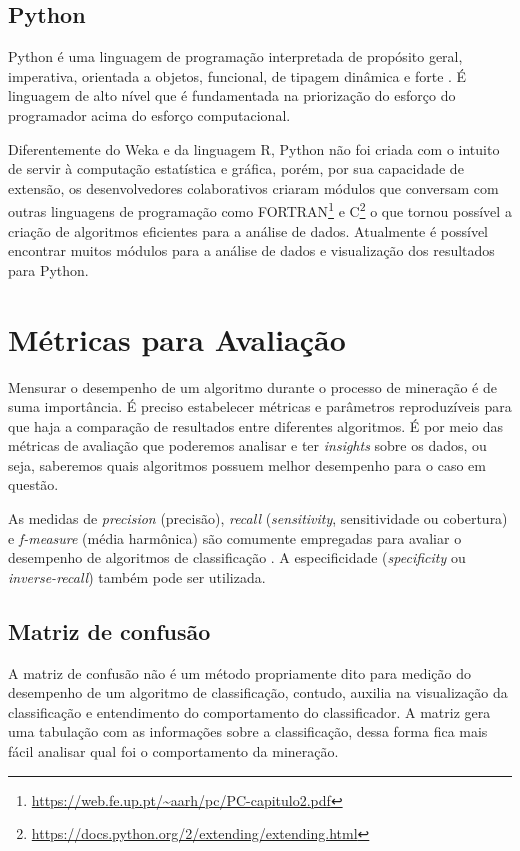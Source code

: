 \subsection{Python}

Python é uma linguagem de programação interpretada de propósito geral, imperativa, orientada a objetos, funcional, de tipagem dinâmica e forte \cite{python2018}. É  linguagem de alto nível que é fundamentada na priorização do esforço do programador acima do esforço computacional.

Diferentemente do Weka e da linguagem R, Python não foi criada com o intuito de servir à computação estatística e gráfica, porém, por sua capacidade de extensão, os desenvolvedores colaborativos criaram módulos que conversam com outras linguagens de programação como FORTRAN\footnote{\url{https://web.fe.up.pt/~aarh/pc/PC-capitulo2.pdf}} e C\footnote{\url{https://docs.python.org/2/extending/extending.html}} o que tornou possível a criação de algoritmos eficientes para a análise de dados. Atualmente é possível encontrar muitos módulos para a análise de dados e visualização dos resultados para Python.

\section{Métricas para Avaliação}

Mensurar o desempenho de um algoritmo durante o processo de mineração é de suma importância. É preciso estabelecer métricas e parâmetros reproduzíveis para que haja a comparação de resultados entre diferentes algoritmos. É por meio das métricas de avaliação que poderemos analisar e ter \textit{insights} sobre os dados, ou seja, saberemos quais algoritmos possuem melhor desempenho para o caso em questão.

As medidas de \textit{precision} (precisão), \textit{recall} (\textit{sensitivity}, sensitividade ou cobertura) e \textit{f-measure} (média harmônica) são comumente empregadas para avaliar o desempenho de algoritmos de classificação \cite{Powers2011}. A especificidade  (\textit{specificity} ou  \textit{inverse-recall}) também pode ser utilizada.

\subsection{Matriz de confusão}

A matriz de confusão não é um método propriamente dito para medição do desempenho de um algoritmo de classificação, contudo, auxilia na visualização da classificação \cite{Deng2016} e entendimento do comportamento do classificador. A matriz gera uma tabulação com as informações sobre a classificação, dessa forma fica mais fácil analisar qual foi o comportamento da mineração.

